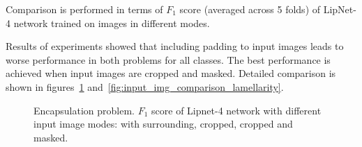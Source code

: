 \documentclass[a4paper, 11pt, table]{article}
\begin{document}
Comparison is performed in terms of $F_1$ score (averaged across 5 folds) of LipNet-4 network trained on images in different modes.

Results of experiments showed that including padding to input images leads to worse performance in both problems for all classes. The best performance is achieved when input images are cropped and masked. Detailed comparison is shown in figures~\ref{fig:input_img_comparison_encapsulation} and~\ref{fig:input_img_comparison_lamellarity}.

\begin{figure}[H]
\centering


\caption{\label{fig:input_img_comparison_encapsulation}Encapsulation problem. $F_1$ score of Lipnet-4 network with different input image modes: with surrounding, cropped, cropped and masked.}
\end{figure}
\end{document}
